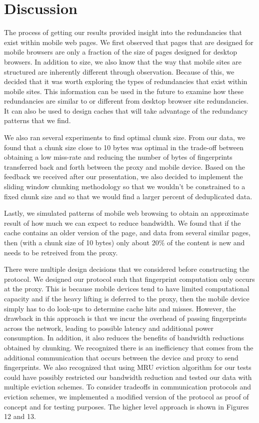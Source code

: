 \section{Discussion}
\label{sec:discussion}
The process of getting our results provided insight into the redundancies that exist within mobile web pages. We first observed that pages that are designed for mobile browsers are only a fraction of the size of pages designed for desktop browsers. In addition to size, we also know that the way that mobile sites are structured are inherently different through observation. Because of this, we decided that it was worth exploring the types of redundancies that exist within mobile sites. This information can be used in the future to examine how these redundancies are similar to or different from desktop browser site redundancies. It can also be used to design caches that will take advantage of the redundancy patterns that we find. 

We also ran several experiments to find optimal chunk size. From our data, we found that a chunk size close to 10 bytes was optimal in the trade-off between obtaining a low miss-rate and reducing the number of bytes of fingerprints transferred back and forth between the proxy and mobile device. Based on the feedback we received after our presentation, we also decided to implement the sliding window chunking methodology so that we wouldn't be constrained to a fixed chunk size and so that we would find a larger percent of deduplicated data. 

Lastly, we simulated patterns of mobile web browsing to obtain an approximate result of how much we can expect to reduce bandwidth. We found that if the cache contains an older version of the page, and data from several similar pages, then (with a chunk size of 10 bytes) only about 20\% of the content is new and needs to be retreived from the proxy. 

There were multiple design decisions that we considered before constructing the protocol. We designed our protocol such that fingerprint computation only occurs at the proxy. This is because mobile devices tend to have limited computational capacity and if the heavy lifting is deferred to the proxy, then the mobile device simply has to do look-ups to determine cache hits and misses. However, the drawback in this approach is that we incur the overhead of passing fingerprints across the network, leading to possible latency and additional power consumption. In addition, it also reduces the benefits of bandwidth reductions obtained by chunking. We recognized there is an inefficiency that comes from the additional communication that occurs between the device and proxy to send fingerprints. We also recognized that using MRU eviction algorithm for our tests could have possibly restricted our bandwidth reduction and tested our data with multiple eviction schemes. To consider tradeoffs in communication protocols and eviction schemes, we implemented a modified version of the protocol as proof of concept and for testing purposes. The higher level approach is shown in Figures 12 and 13. 

